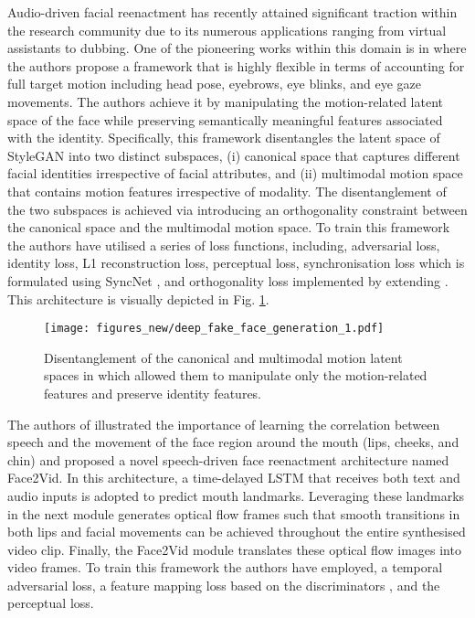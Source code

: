 Audio-driven facial reenactment has recently attained significant traction within the research community due to its numerous applications ranging from virtual assistants to dubbing. One of the pioneering works within this domain is in \cite{jang2023s} where the authors propose a framework that is highly flexible in terms of accounting for full target motion including head pose, eyebrows, eye blinks, and eye gaze movements. The authors achieve it by manipulating the motion-related latent space of the face while preserving semantically meaningful features associated with the identity. Specifically, this framework disentangles the latent space of StyleGAN into two distinct subspaces, (i) canonical space that captures different facial identities irrespective of facial attributes, and (ii) multimodal motion space that contains motion features irrespective of modality. The disentanglement of the two subspaces is achieved via introducing an orthogonality constraint between the canonical space and the multimodal motion space. To train this framework the authors have utilised a series of loss functions, including, adversarial loss, identity loss, L1 reconstruction loss, perceptual loss, synchronisation loss which is formulated using SyncNet \cite{chung2017out}, and orthogonality loss implemented by extending \cite{yang2021l2m}. This architecture is visually depicted in Fig. \ref{fig:jang2023s}. 

\begin{figure}[htbp]
    \centering
    \texttt{[image: figures\_new/deep\_fake\_face\_generation\_1.pdf]}
    \caption{Disentanglement of the canonical and multimodal motion latent spaces in \cite{jang2023s} which allowed them to manipulate only the motion-related features and preserve identity features.}
    \label{fig:jang2023s}
\end{figure}

The authors of \cite{yu2020multimodal} illustrated the importance of learning the correlation between speech and the movement of the face region around the mouth (lips, cheeks, and chin) and proposed a novel speech-driven face reenactment architecture named Face2Vid. In this architecture, a time-delayed LSTM that receives both text and audio inputs is adopted to predict mouth landmarks. Leveraging these landmarks in the next module generates optical flow frames such that smooth transitions in both lips and facial movements can be achieved throughout the entire synthesised video clip. Finally, the Face2Vid module translates these optical flow images into video frames. To train this framework the authors have employed, a temporal adversarial loss, a feature mapping loss based on the discriminators \cite{wang2018high}, and the perceptual loss. 

